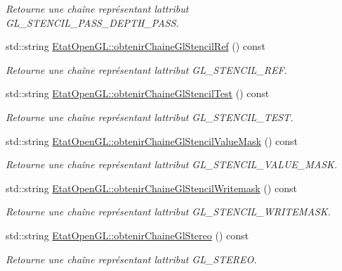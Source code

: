 \begin{DoxyCompactItemize}
\begin{DoxyCompactList}\small\item\em Retourne une chaîne représentant l\textquotesingle{}attribut G\+L\+\_\+\+S\+T\+E\+N\+C\+I\+L\+\_\+\+P\+A\+S\+S\+\_\+\+D\+E\+P\+T\+H\+\_\+\+P\+A\+S\+S. \end{DoxyCompactList}\item 
std\+::string \hyperlink{group__utilitaire_ga31c961d29726d9daaf4d7cfc78025a6b}{Etat\+Open\+G\+L\+::obtenir\+Chaine\+Gl\+Stencil\+Ref} () const 
\begin{DoxyCompactList}\small\item\em Retourne une chaîne représentant l\textquotesingle{}attribut G\+L\+\_\+\+S\+T\+E\+N\+C\+I\+L\+\_\+\+R\+E\+F. \end{DoxyCompactList}\item 
std\+::string \hyperlink{group__utilitaire_ga3c3fb4e59ed994063e62893114882ad7}{Etat\+Open\+G\+L\+::obtenir\+Chaine\+Gl\+Stencil\+Test} () const 
\begin{DoxyCompactList}\small\item\em Retourne une chaîne représentant l\textquotesingle{}attribut G\+L\+\_\+\+S\+T\+E\+N\+C\+I\+L\+\_\+\+T\+E\+S\+T. \end{DoxyCompactList}\item 
std\+::string \hyperlink{group__utilitaire_ga88f72c76847937fa57511a7758f43d43}{Etat\+Open\+G\+L\+::obtenir\+Chaine\+Gl\+Stencil\+Value\+Mask} () const 
\begin{DoxyCompactList}\small\item\em Retourne une chaîne représentant l\textquotesingle{}attribut G\+L\+\_\+\+S\+T\+E\+N\+C\+I\+L\+\_\+\+V\+A\+L\+U\+E\+\_\+\+M\+A\+S\+K. \end{DoxyCompactList}\item 
std\+::string \hyperlink{group__utilitaire_ga4dbeac5dc5d9ad85a54af632e3f96aac}{Etat\+Open\+G\+L\+::obtenir\+Chaine\+Gl\+Stencil\+Writemask} () const 
\begin{DoxyCompactList}\small\item\em Retourne une chaîne représentant l\textquotesingle{}attribut G\+L\+\_\+\+S\+T\+E\+N\+C\+I\+L\+\_\+\+W\+R\+I\+T\+E\+M\+A\+S\+K. \end{DoxyCompactList}\item 
std\+::string \hyperlink{group__utilitaire_gadb2e39bc8896bcdd38587b23347df156}{Etat\+Open\+G\+L\+::obtenir\+Chaine\+Gl\+Stereo} () const 
\begin{DoxyCompactList}\small\item\em Retourne une chaîne représentant l\textquotesingle{}attribut G\+L\+\_\+\+S\+T\+E\+R\+E\+O. \end{DoxyCompactList}\item 

\end{DoxyCompactItemize}
